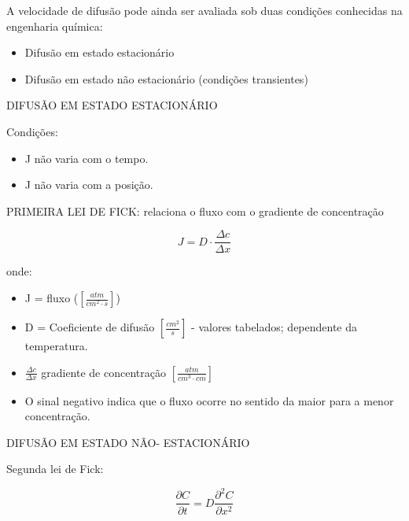 A velocidade de difusão pode ainda ser avaliada sob duas condições conhecidas na engenharia química:

\begin{itemize}
\item Difusão em estado estacionário
\item Difusão em estado não estacionário (condições transientes)
\end{itemize}

DIFUSÃO EM ESTADO ESTACIONÁRIO

Condições:

\begin{itemize}
	\item J não varia com o tempo.
	\item J não varia com a posição.
\end{itemize}

PRIMEIRA LEI DE FICK: relaciona o fluxo com o gradiente de concentração

\begin{equation}\label{key}
J = D \cdot \frac{\Delta c}{\Delta x}
\end{equation}

onde: 

\begin{itemize}
	\item J = fluxo ($[\frac{atm}{cm^{2}\cdot s}]$)
	\item D = Coeficiente de difusão $[\frac{cm^{2}}{s}]$ - valores tabelados; dependente da temperatura.
	\item $\frac{\Delta c}{\Delta x}$ gradiente de concentração $[\frac{atm}{cm^{3} \cdot cm}]$
	\item O sinal negativo indica que o fluxo ocorre no sentido da maior para a menor concentração.
\end{itemize}

DIFUSÃO EM ESTADO NÃO- ESTACIONÁRIO

Segunda lei de Fick:

\begin{equation}\label{key}
\frac{\partial C}{\partial t}=D \frac{\partial^{2} C}{\partial x^{2}}
\end{equation}



